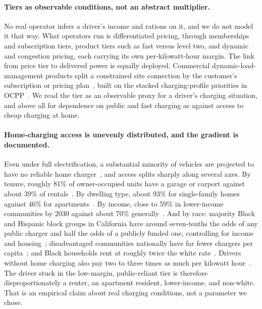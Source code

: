 \documentclass[manuscript, screen, review, anonymous]{acmart}
\begin{document}
\paragraph{Tiers as observable conditions, not an abstract multiplier.}
No real operator infers a driver's income and rations on it, and we do not model it that way. What operators run is differentiated pricing, through memberships and subscription tiers, product tiers such as fast versus level two, and dynamic and congestion pricing, each carrying its own per-kilowatt-hour margin. The link from price tier to delivered power is equally deployed. Commercial dynamic-load-management products split a constrained site connection by the customer's subscription or pricing plan~\cite{ampeco2026}, built on the stacked charging-profile priorities in OCPP~\cite{ocpp201}. We read the tier as an observable proxy for a driver's charging situation, and above all for dependence on public and fast charging as against access to cheap charging at home.

\paragraph{Home-charging access is unevenly distributed, and the gradient is documented.}
Even under full electrification, a substantial minority of vehicles are projected to have no reliable home charger~\cite{ge2021there}, and access splits sharply along several axes. By tenure, roughly 81\% of owner-occupied units have a garage or carport against about 39\% of rentals~\cite{doeeere2018}. By dwelling type, about 93\% for single-family homes against 46\% for apartments~\cite{bauer2021charging}. By income, close to 59\% in lower-income communities by 2030 against about 70\% generally~\cite{bauer2021charging}. And by race: majority Black and Hispanic block groups in California have around seven-tenths the odds of any public charger and half the odds of a publicly funded one, controlling for income and housing~\cite{hsu2021public}; disadvantaged communities nationally have far fewer chargers per capita~\cite{yu2025equity}; and Black households rent at roughly twice the white rate~\cite{lou2024income,khan2022inequitable}. Drivers without home charging also pay two to three times as much per kilowatt hour~\cite{borlaug2025economics,eia2025}. The driver stuck in the low-margin, public-reliant tier is therefore disproportionately a renter, an apartment resident, lower-income, and non-white. That is an empirical claim about real charging conditions, not a parameter we chose.
\end{document}
